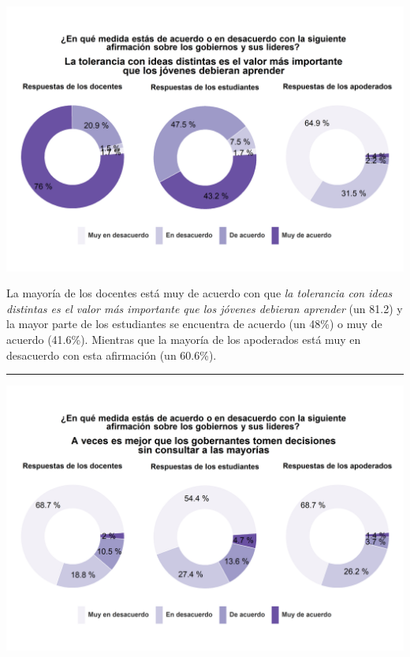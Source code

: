 \documentclass[
  14pt,
]{book}
\let\origfigure\figure
\let\endorigfigure\endfigure
\renewenvironment{figure}[1][2] {
  \expandafter\origfigure\expandafter[H]
} {
  \endorigfigure
}
\begin{document}
\begin{figure}[!ht]

{\centering \includegraphics[width=0.8\linewidth,]{images/graph_aut3} 

}

\caption{Tolerar ideas distintas es el valor más importante que debieran aprender}\label{fig:unnamed-chunk-44}
\end{figure}

La mayoría de los docentes está muy de acuerdo con que \emph{la tolerancia con ideas distintas es el valor más importante que los jóvenes debieran aprender} (un 81.2) y la mayor parte de los estudiantes se encuentra de acuerdo (un 48\%) o muy de acuerdo (41.6\%). Mientras que la mayoría de los apoderados está muy en desacuerdo con esta afirmación (un 60.6\%).

\begin{center}\rule{0.5\linewidth}{0.5pt}\end{center}

\begin{figure}[!ht]

{\centering \includegraphics[width=0.8\linewidth,]{images/graph_aut4} 

}

\caption{A veces es mejor que se tomen decisiones sin consultar a las mayorías}\label{fig:unnamed-chunk-45}
\end{figure}
\end{document}
